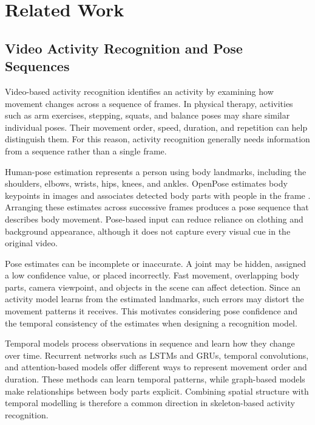 \section{Related Work}\label{sec:related_work}
\vspace{-0.8\baselineskip}

\subsection{Video Activity Recognition and Pose Sequences}

Video-based activity recognition identifies an activity by examining how movement changes across a sequence of frames. In physical therapy, activities such as arm exercises, stepping, squats, and balance poses may share similar individual poses. Their movement order, speed, duration, and repetition can help distinguish them. For this reason, activity recognition generally needs information from a sequence rather than a single frame.

Human-pose estimation represents a person using body landmarks, including the shoulders, elbows, wrists, hips, knees, and ankles. OpenPose estimates body keypoints in images and associates detected body parts with people in the frame \cite{Cao2021OpenPose}. Arranging these estimates across successive frames produces a pose sequence that describes body movement. Pose-based input can reduce reliance on clothing and background appearance, although it does not capture every visual cue in the original video.

Pose estimates can be incomplete or inaccurate. A joint may be hidden, assigned a low confidence value, or placed incorrectly. Fast movement, overlapping body parts, camera viewpoint, and objects in the scene can affect detection. Since an activity model learns from the estimated landmarks, such errors may distort the movement patterns it receives. This motivates considering pose confidence and the temporal consistency of the estimates when designing a recognition model.

Temporal models process observations in sequence and learn how they change over time. Recurrent networks such as LSTMs and GRUs, temporal convolutions, and attention-based models offer different ways to represent movement order and duration. These methods can learn temporal patterns, while graph-based models make relationships between body parts explicit. Combining spatial structure with temporal modelling is therefore a common direction in skeleton-based activity recognition.

